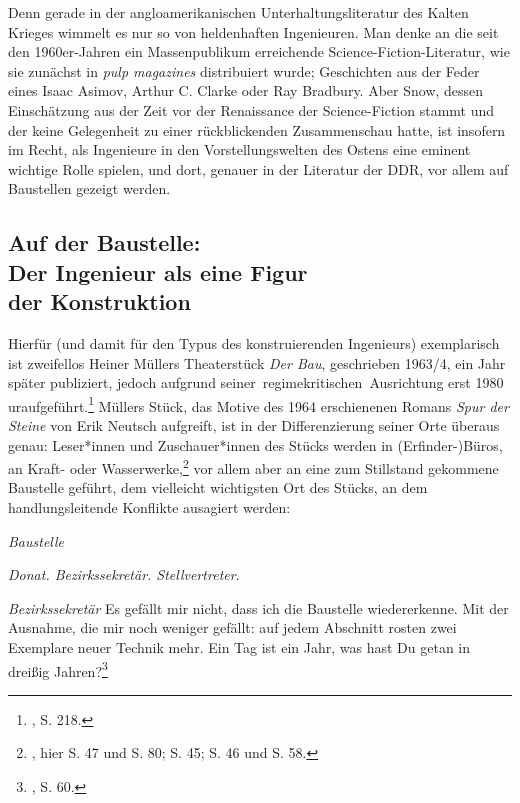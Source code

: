 \documentclass[%
	fontsize=10pt,%
	twoside,%
	headings=optiontoheadandtoc,%
	showtrims]{scrbook}
\renewenvironment{quote}{%
  \addmargin[\genericindent]{0pt}%
  \KOMAoptions{parskip=true}%
  \ifdim\parskip>0pt\else\addvspace{\intextsep}\fi
}{%
  \par
  \endaddmargin\vspace{\intextsep}
}
\renewcommand{\texttt}{\nohyphens} %
\begin{document}
Denn gerade in der angloamerikanischen Unterhaltungsliteratur des Kalten Krieges wimmelt es nur so von heldenhaften Ingenieuren. Man denke an die seit den 1960er-Jahren ein Massenpublikum erreichende Science-Fiction-Literatur, wie sie zunächst in \emph{pulp magazines} distribuiert wurde; Geschichten aus der Feder eines Isaac Asimov, Arthur C. Clarke oder Ray Bradbury. Aber Snow, dessen Einschätzung aus der Zeit vor der Renaissance der Science-Fiction stammt und der keine Gelegenheit zu einer rückblickenden Zusammenschau hatte, ist insofern im Recht, als Ingenieure in den Vorstellungswelten des Ostens eine eminent wichtige Rolle spielen, und dort, genauer in der Literatur der DDR, vor allem auf Baustellen gezeigt werden.
\subsection[Auf der Baustelle:    Der Ingenieur als eine Figur    der Konstruktion]{Auf der Baustelle: \- \protect\\ Der Ingenieur als eine Figur \- \protect\\ der Konstruktion}
\par Hierfür (und damit für den Typus des konstruierenden Ingenieurs) exemplarisch ist zweifellos Heiner Müllers Theaterstück \emph{Der Bau}, geschrieben 1963/4, ein Jahr später publiziert, jedoch aufgrund \texttt{seiner~regimekritischen~Ausrichtung} erst 1980 uraufgeführt.\footnote{\cite[][]{emmerich1996a}, S. 218.}  Müllers Stück, das Motive des 1964 erschienenen Romans \emph{Spur der Steine} von Erik Neutsch aufgreift, ist in der Differenzierung seiner Orte überaus genau: Leser*innen und Zuschauer*innen des Stücks werden in (Erfinder-)Büros, an Kraft- oder Wasserwerke,\footnote{\cite[][]{mueller1981a}, hier S. 47 und S. 80; S. 45; S. 46 und S. 58.}  vor allem aber an eine zum Stillstand gekommene Baustelle geführt, dem vielleicht wichtigsten Ort des Stücks, an dem handlungsleitende Konflikte ausagiert werden:\begin{quote}
\par \emph{Baustelle}\par \emph{Donat. Bezirkssekretär. Stellvertreter}.\par \emph{Bezirkssekretär} Es gefällt mir nicht, dass ich die Baustelle wiedererkenne. Mit der Ausnahme, die mir noch weniger gefällt: auf jedem Abschnitt rosten zwei Exemplare neuer Technik mehr. Ein Tag ist ein Jahr, was hast Du getan in dreißig Jahren?\footnote{\cite[][]{mueller1981a}, S. 60.} 
\end{quote}
\end{document}
